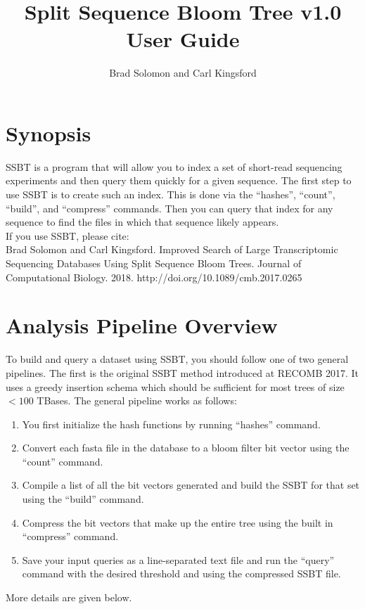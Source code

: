 \documentclass{article}
\title{Split Sequence Bloom Tree v1.0 User Guide}
\author{Brad Solomon and Carl Kingsford}
\begin{document}
\maketitle

\section{Synopsis}

SSBT is a program that will allow you to index a set of short-read sequencing experiments and then query them quickly for a given sequence. The first step to use SSBT is to create such an index. This is done via the ``hashes'', ``count'',  ``build'', and ``compress'' commands. Then you can query that index for any sequence to find the files in which that sequence likely appears. \\

If you use SSBT, please cite:\\

Brad Solomon and Carl Kingsford. Improved Search of Large Transcriptomic Sequencing Databases Using Split Sequence Bloom Trees. Journal of Computational Biology. 2018. http://doi.org/10.1089/cmb.2017.0265

\section{Analysis Pipeline Overview}

To build and query a dataset using SSBT, you should follow one of two general pipelines. The first is the original SSBT method introduced at RECOMB 2017. It uses a greedy insertion schema which should be sufficient for most trees of size $<100$ TBases. The general pipeline works as follows:
\begin{enumerate}
\item You first initialize the hash functions by running ``hashes'' command. 
\item Convert each fasta file in the database to a bloom filter bit vector using the  ``count'' command. 
\item Compile a list of all the bit vectors generated and build the SSBT for that set using the ``build'' command.
\item Compress the bit vectors that make up the entire tree using the built in ``compress'' command.
\item Save your input queries as a line-separated text file and run the ``query'' command with the desired threshold and using the compressed SSBT file.
\end{enumerate}
More details are given below.
\end{document}
